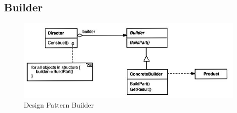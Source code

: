 	\subsection{Builder}
	\begin{figure}[h!]
	\begin{center}
		\includegraphics[scale=1]{../images/Builder.png}
		\caption{Design Pattern Builder}
	\end{center}
	\end{figure}
